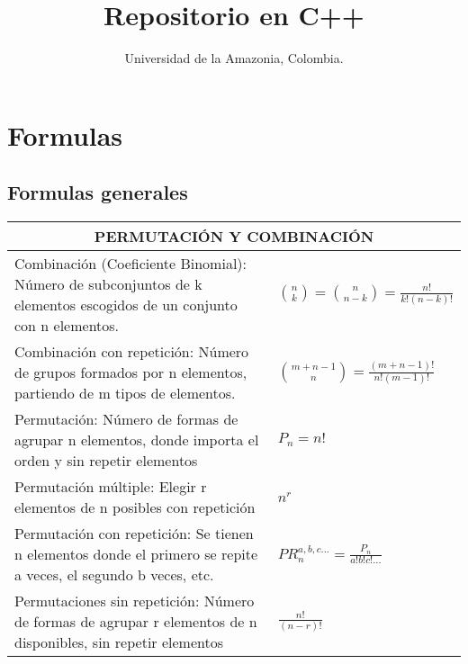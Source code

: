 \documentclass[10pt,landscape,twocolumn,letterpaper,twosided]{article}
\begin{document}
	
	\title{Repositorio en C++}
	\author{Universidad de la Amazonia, Colombia.}
	\maketitle
	
	\tableofcontents
	\hfill
	
	\section{Formulas}

		\subsection{Formulas generales}
			\begin{tabular}{|p{6.5cm}|p{3.9cm}|}
				\hline
				\multicolumn{2}{|c|}{PERMUTACIÓN Y COMBINACIÓN} \\ \hline
				Combinación (Coeficiente Binomial): Número de subconjuntos de k elementos escogidos de un conjunto con n
					elementos.
					& $ \binom{n}{k} = \binom{n}{n-k} = \displaystyle\frac{n!}{k!(n-k)!} $ \\ \hline

				Combinación con repetición: Número de grupos formados por n elementos, partiendo de m tipos de elementos.
					& $ \binom{m+n-1}{n} = \displaystyle\frac{(m + n - 1)!}{n!(m-1)!} $ \\ \hline
		
				Permutación: Número de formas de agrupar n elementos, donde importa el orden y sin repetir elementos
					& $ P_{n} = n! $ \\ \hline

				Permutación múltiple: Elegir r elementos de n posibles con repetición 
					& $ n^{r} $	\\ \hline
	
				Permutación con repetición: Se tienen n elementos donde el primero se repite a veces, el segundo b veces, etc.
					& $ PR_{n}^{a,b,c...} = \displaystyle\frac{P_{n}}{a!b!c!...}$ \\ \hline
	
				Permutaciones sin repetición: Número de formas de agrupar r elementos de n disponibles, sin repetir elementos
					& $\displaystyle\frac{n!}{(n-r)!}$ \\ \hline
			\end{tabular}
			
\end{document}
